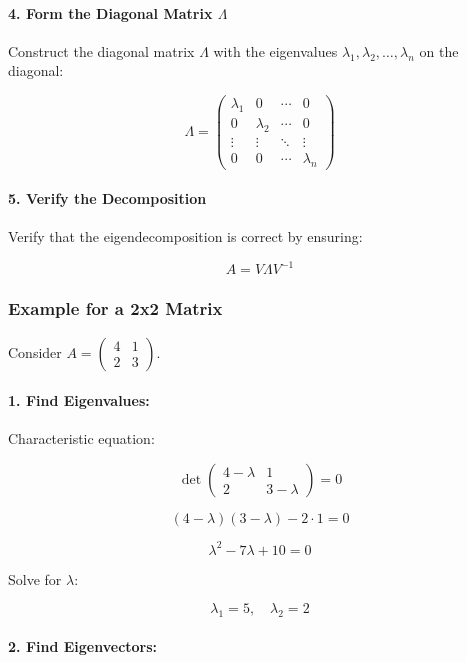 \documentclass[12pt]{article}
\begin{document}
\paragraph{4. Form the Diagonal Matrix \( \Lambda \)}
Construct the diagonal matrix \( \Lambda \) with the eigenvalues \( \lambda_1, \lambda_2, \ldots, \lambda_n \) on the diagonal:

\[ \Lambda = \begin{pmatrix} \lambda_1 & 0 & \cdots & 0 \\ 0 & \lambda_2 & \cdots & 0 \\ \vdots & \vdots & \ddots & \vdots \\ 0 & 0 & \cdots & \lambda_n \end{pmatrix} \]

\paragraph{5. Verify the Decomposition}
Verify that the eigendecomposition is correct by ensuring:

\[ A = V \Lambda V^{-1} \]

\subsubsection{Example for a 2x2 Matrix}

Consider \( A = \begin{pmatrix} 4 & 1 \\ 2 & 3 \end{pmatrix} \).

\paragraph{1. Find Eigenvalues:}

Characteristic equation:

\[ \det \begin{pmatrix} 4 - \lambda & 1 \\ 2 & 3 - \lambda \end{pmatrix} = 0 \]

\[ (4 - \lambda)(3 - \lambda) - 2 \cdot 1 = 0 \]

\[ \lambda^2 - 7\lambda + 10 = 0 \]

Solve for \( \lambda \):

\[ \lambda_1 = 5, \quad \lambda_2 = 2 \]

\paragraph{2. Find Eigenvectors:}
\end{document}
